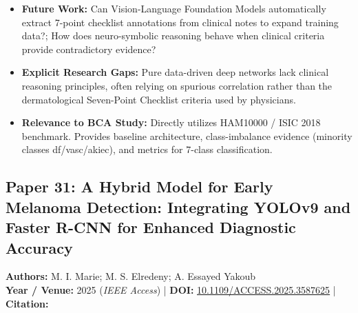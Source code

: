 \documentclass[11pt,a4paper]{article}
\begin{document}
\begin{itemize}
\item \textbf{Future Work:} Can Vision-Language Foundation Models automatically extract 7-point checklist annotations from clinical notes to expand training data?; How does neuro-symbolic reasoning behave when clinical criteria provide contradictory evidence?
\item \textbf{Explicit Research Gaps:} Pure data-driven deep networks lack clinical reasoning principles, often relying on spurious correlation rather than the dermatological Seven-Point Checklist criteria used by physicians.
\item \textbf{Relevance to BCA Study:} Directly utilizes HAM10000 / ISIC 2018 benchmark. Provides baseline architecture, class-imbalance evidence (minority classes df/vasc/akiec), and metrics for 7-class classification.
\end{itemize}

\subsection{Paper 31: A Hybrid Model for Early Melanoma Detection: Integrating YOLOv9 and Faster R-CNN for Enhanced Diagnostic Accuracy}
\textbf{Authors:} M. I. Marie; M. S. Elredeny; A. Essayed Yakoub \\
\textbf{Year / Venue:} 2025 (\textit{IEEE Access}) | \textbf{DOI:} \href{https://doi.org/10.1109/ACCESS.2025.3587625}{10.1109/ACCESS.2025.3587625} | \textbf{Citation:} \cite{11077147}
\end{document}
